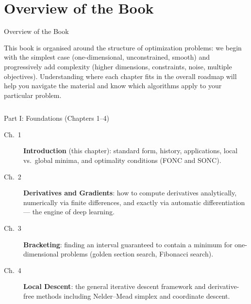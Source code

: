 \documentclass[aspectratio=169,10pt]{beamer}
\begin{document}
\section{Overview of the Book}

\begin{frame}[allowframebreaks]{Overview of the Book}

This book is organised around the structure of optimization problems:
we begin with the simplest case (one-dimensional, unconstrained, smooth)
and progressively add complexity (higher dimensions, constraints, noise,
multiple objectives).  Understanding where each chapter fits in the overall
roadmap will help you navigate the material and know which algorithms apply
to your particular problem.

  \begin{columns}[T]
      \begin{block}{Part I: Foundations (Chapters 1--4)}
        \begin{description}
          \item[Ch.\ 1] \textbf{Introduction} (this chapter): standard form,
            history, applications, local vs.\ global minima, and optimality
            conditions (FONC and SONC).
          \item[Ch.\ 2] \textbf{Derivatives and Gradients}: how to compute
            derivatives analytically, numerically via finite differences, and
            exactly via automatic differentiation --- the engine of deep learning.
          \item[Ch.\ 3] \textbf{Bracketing}: finding an interval guaranteed to
            contain a minimum for one-dimensional problems (golden section search,
            Fibonacci search).
          \item[Ch.\ 4] \textbf{Local Descent}: the general iterative descent
            framework and derivative-free methods including Nelder--Mead simplex
            and coordinate descent.
        \end{description}
      \end{block}

      \vspace{0.3em}


\end{columns}
\end{frame}
\end{document}
